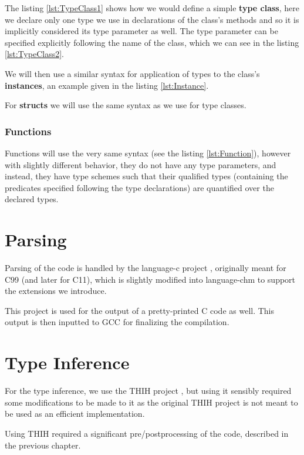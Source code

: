 The listing \ref{lst:TypeClass1} shows how we would define a simple \textbf{type class}, here we declare only one type we use in declarations of the class's methods and so it is implicitly considered its type parameter as well. The type parameter can be specified explicitly following the name of the class, which we can see in the listing \ref{lst:TypeClass2}.

We will then use a similar syntax for application of types to the class's \textbf{instances}, an example given in the listing \ref{lst:Instance}.

For \textbf{structs} we will use the same syntax as we use for type classes.

\subsubsection{Functions}

Functions will use the very same syntax (see the listing \ref{lst:Function}), however with slightly different behavior, they do not have any type parameters, and instead, they have type schemes such that their qualified types (containing the predicates specified following the type declarations) are quantified over the declared types.

\section{Parsing}

Parsing of the code is handled by the language-c project \cite{visq2018language-c}, originally meant for C99 (and later for C11), which is slightly modified into language-chm to support the extensions we introduce.

This project is used for the output of a pretty-printed C code as well. This output is then inputted to GCC for finalizing the compilation.

\section{Type Inference}

For the type inference, we use the THIH project \cite{jones1999typing}, but using it sensibly required some modifications to be made to it as the original THIH project is not meant to be used as an efficient implementation.

Using THIH required a significant pre/postprocessing of the code, described in the previous chapter.

